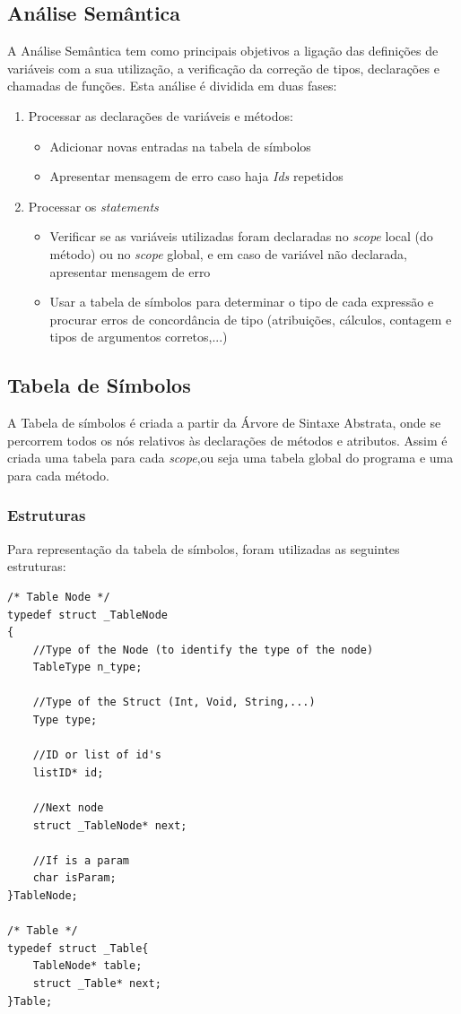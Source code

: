 \documentclass[12pt]{article}
\begin{document}
\subsection{Análise Semântica}
A Análise Semântica tem como principais objetivos a ligação das definições de variáveis com a sua utilização, a verificação da correção de tipos, declarações e chamadas de funções.
Esta análise é dividida em duas fases:
	\begin{enumerate}
		\item Processar as declarações de variáveis e métodos:
		\begin{itemize}
			\item Adicionar novas entradas na tabela de símbolos
			\item Apresentar mensagem de erro caso haja \emph{Ids} repetidos
		\end{itemize}
		\item Processar os \emph{statements}
		\begin{itemize}
			\item Verificar se as variáveis utilizadas foram declaradas no  \emph{scope} local (do método) ou no \emph{scope} global, e em caso de variável não declarada, apresentar mensagem de erro
			\item Usar a tabela de símbolos para determinar o tipo de cada expressão e procurar erros de concordância de tipo (atribuições, cálculos, contagem e tipos de argumentos corretos,...)
		\end{itemize}
	\end{enumerate}

\subsection{Tabela de Símbolos}

A Tabela de símbolos é criada a partir da Árvore de Sintaxe Abstrata, onde se percorrem todos os nós relativos às declarações de métodos e atributos. Assim é criada uma tabela para cada \emph{scope},ou seja uma tabela global do programa e uma para cada método.
 \pagebreak
\subsubsection{Estruturas}
Para representação da tabela de símbolos, foram utilizadas as seguintes estruturas:
\begin{lstlisting}
/* Table Node */
typedef struct _TableNode
{
    //Type of the Node (to identify the type of the node)
    TableType n_type;
    
    //Type of the Struct (Int, Void, String,...)
    Type type;
    
    //ID or list of id's
    listID* id;
    
    //Next node
    struct _TableNode* next;
    
    //If is a param
    char isParam;
}TableNode;

/* Table */
typedef struct _Table{
    TableNode* table;
    struct _Table* next;
}Table;

\end{lstlisting}
\end{document}
